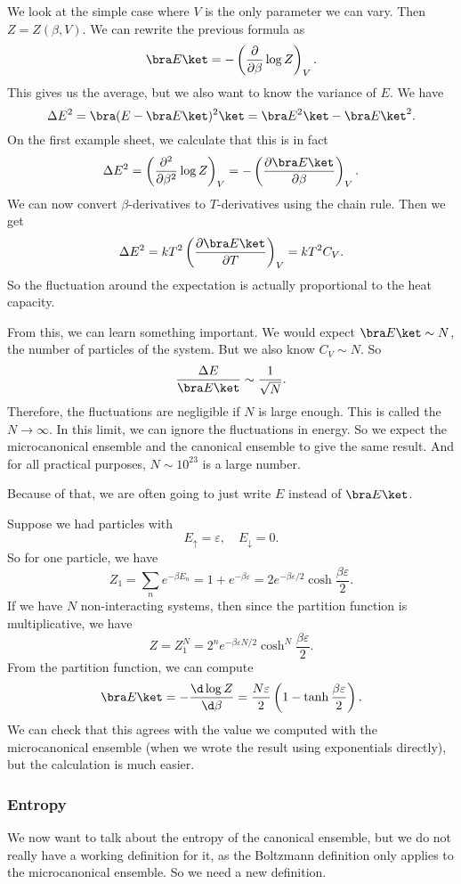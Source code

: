 \documentclass[a4paper]{article}
\begin{document}
We look at the simple case where $V$ is the only parameter we can vary. Then $Z = Z(\beta, V)$. We can rewrite the previous formula as
\[
  \bra E \ket = - \left(\frac{\partial}{\partial \beta} \log Z\right)_V.
\]
This gives us the average, but we also want to know the variance of $E$. We have
\[
  \Delta E^2 = \bra (E - \bra E\ket)^2 \ket = \bra E^2\ket - \bra E\ket^2.
\]
On the first example sheet, we calculate that this is in fact
\[
  \Delta E^2 = \left(\frac{\partial^2}{\partial \beta^2} \log Z\right)_V = - \left(\frac{\partial \bra E\ket}{\partial \beta}\right)_V.
\]
We can now convert $\beta$-derivatives to $T$-derivatives using the chain rule. Then we get
\[
  \Delta E^2 = kT^2 \left(\frac{\partial \bra E\ket}{\partial T}\right)_V = kT^2 C_V.
\]
So the fluctuation around the expectation is actually proportional to the heat capacity.

From this, we can learn something important. We would expect $\bra E\ket \sim N$, the number of particles of the system. But we also know $C_V \sim N$. So
\[
  \frac{\Delta E}{\bra E\ket} \sim \frac{1}{\sqrt{N}}.
\]
Therefore, the fluctuations are negligible if $N$ is large enough. This is called the  $N \to \infty$. In this limit, we can ignore the fluctuations in energy. So we expect the microcanonical ensemble and the canonical ensemble to give the same result. And for all practical purposes, $N \sim 10^{23}$ is a large number.

Because of that, we are often going to just write $E$ instead of $\bra E\ket$.

\begin{eg}
  Suppose we had particles with
  \[
    E_{\uparrow} = \varepsilon,\quad E_{\downarrow} = 0.
  \]
  So for one particle, we have
  \[
    Z_1 = \sum_n e^{-\beta E_n} = 1 + e^{-\beta \varepsilon} = 2 e^{-\beta \varepsilon/2} \cosh \frac{\beta \varepsilon}{2}.
  \]
  If we have $N$ non-interacting systems, then since the partition function is multiplicative, we have
  \[
    Z = Z_1^N = 2^n e^{-\beta \varepsilon N/2} \cosh^N \frac{\beta \varepsilon}{2}.
  \]
  From the partition function, we can compute
  \[
    \bra E \ket = - \frac{\d \log Z}{\d \beta} = \frac{N\varepsilon}{2}\left(1 - \tanh \frac{\beta \varepsilon}{2}\right).
  \]
  We can check that this agrees with the value we computed with the microcanonical ensemble (when we wrote the result using exponentials directly), but the calculation is much easier.
\end{eg}

\subsubsection*{Entropy}
We now want to talk about the entropy of the canonical ensemble, but we do not really have a working definition for it, as the Boltzmann definition only applies to the microcanonical ensemble. So we need a new definition.
\end{document}
